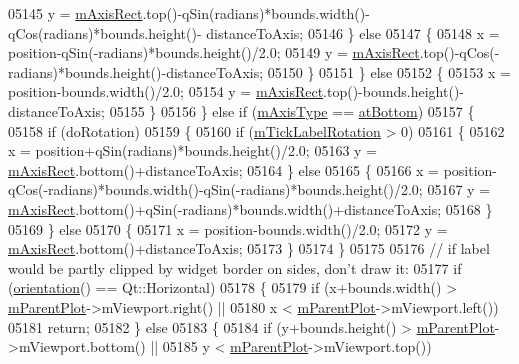 \begin{DoxyCode}
05145         y = \hyperlink{a00025_ad63d51f30f835f3a568b6231362ed4a0}{mAxisRect}.top()-qSin(radians)*bounds.width()-qCos(radians)*bounds.height()-
      distanceToAxis;
05146       \} \textcolor{keywordflow}{else}
05147       \{
05148         x = position-qSin(-radians)*bounds.height()/2.0;
05149         y = \hyperlink{a00025_ad63d51f30f835f3a568b6231362ed4a0}{mAxisRect}.top()-qCos(-radians)*bounds.height()-distanceToAxis;
05150       \}
05151     \} \textcolor{keywordflow}{else}
05152     \{
05153       x = position-bounds.width()/2.0;
05154       y = \hyperlink{a00025_ad63d51f30f835f3a568b6231362ed4a0}{mAxisRect}.top()-bounds.height()-distanceToAxis;
05155     \}
05156   \} \textcolor{keywordflow}{else} \textcolor{keywordflow}{if} (\hyperlink{a00025_ae704bf9f2c2b026f08dd4ccad79c616e}{mAxisType} == \hyperlink{a00025_ae2bcc1728b382f10f064612b368bc18aa220d68888516b6c3b493d144f1ba438f}{atBottom})
05157   \{
05158     \textcolor{keywordflow}{if} (doRotation)
05159     \{
05160       \textcolor{keywordflow}{if} (\hyperlink{a00025_a47660c8694884cdb87495bf8b4c8a3b9}{mTickLabelRotation} > 0)
05161       \{
05162         x = position+qSin(radians)*bounds.height()/2.0;
05163         y = \hyperlink{a00025_ad63d51f30f835f3a568b6231362ed4a0}{mAxisRect}.bottom()+distanceToAxis;
05164       \} \textcolor{keywordflow}{else}
05165       \{
05166         x = position-qCos(-radians)*bounds.width()-qSin(-radians)*bounds.height()/2.0;
05167         y = \hyperlink{a00025_ad63d51f30f835f3a568b6231362ed4a0}{mAxisRect}.bottom()+qSin(-radians)*bounds.width()+distanceToAxis;
05168       \}
05169     \} \textcolor{keywordflow}{else}
05170     \{
05171       x = position-bounds.width()/2.0;
05172       y = \hyperlink{a00025_ad63d51f30f835f3a568b6231362ed4a0}{mAxisRect}.bottom()+distanceToAxis;
05173     \}
05174   \}
05175   
05176   \textcolor{comment}{// if label would be partly clipped by widget border on sides, don't draw it:}
05177   \textcolor{keywordflow}{if} (\hyperlink{a00025_a57483f2f60145ddc9e63f3af53959265}{orientation}() == Qt::Horizontal)
05178   \{
05179     \textcolor{keywordflow}{if} (x+bounds.width() > \hyperlink{a00044_aa2a528433e44db02b8aef23c1f9f90ed}{mParentPlot}->mViewport.right() ||
05180         x < \hyperlink{a00044_aa2a528433e44db02b8aef23c1f9f90ed}{mParentPlot}->mViewport.left())
05181       \textcolor{keywordflow}{return};
05182   \} \textcolor{keywordflow}{else}
05183   \{
05184     \textcolor{keywordflow}{if} (y+bounds.height() > \hyperlink{a00044_aa2a528433e44db02b8aef23c1f9f90ed}{mParentPlot}->mViewport.bottom() ||
05185         y < \hyperlink{a00044_aa2a528433e44db02b8aef23c1f9f90ed}{mParentPlot}->mViewport.top())

\end{DoxyCode}
